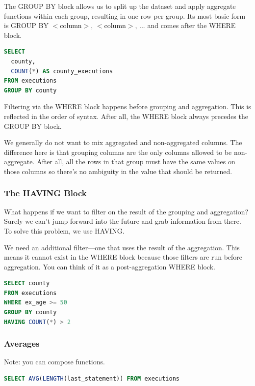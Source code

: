 \documentclass{article}
\begin{document}
The GROUP BY block allows us to split up the dataset and apply aggregate functions within each group, resulting in one row per group. Its most basic form is GROUP BY $<$column$>$, $<$column$>$, ... and comes after the WHERE block.

\vspace{8pt} \begin{lstlisting}[language=SQL]
SELECT
  county,
  COUNT(*) AS county_executions
FROM executions
GROUP BY county
\end{lstlisting} \vspace{8pt}

Filtering via the WHERE block happens before grouping and aggregation. This is reflected in the order of syntax. After all, the WHERE block always precedes the GROUP BY block.

We generally do not want to mix aggregated and non-aggregated columns. The difference here is that grouping columns are the only columns allowed to be non-aggregate. After all, all the rows in that group must have the same values on those columns so there’s no ambiguity in the value that should be returned.

\subsubsection{The HAVING Block }

What happens if we want to filter on the result of the grouping and aggregation? Surely we can’t jump forward into the future and grab information from there. To solve this problem, we use HAVING.

We need an additional filter—one that uses the result of the aggregation. This means it cannot exist in the WHERE block because those filters are run before aggregation. You can think of it as a post-aggregation WHERE block.

\vspace{8pt} \begin{lstlisting}[language=SQL]
SELECT county
FROM executions
WHERE ex_age >= 50
GROUP BY county
HAVING COUNT(*) > 2
\end{lstlisting} \vspace{8pt}

\subsubsection{Averages}

Note: you can compose functions.

\vspace{8pt} \begin{lstlisting}[language=SQL]
SELECT AVG(LENGTH(last_statement)) FROM executions
\end{lstlisting} \vspace{8pt}
\end{document}
